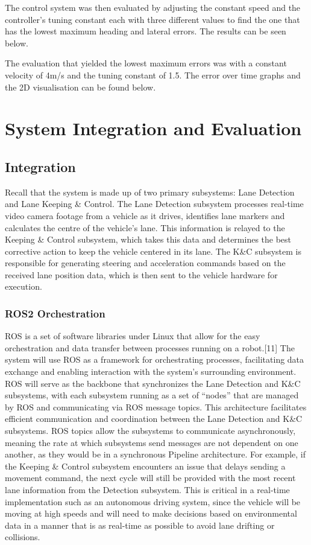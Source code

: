 \documentclass[titlepage]{article}
\begin{document}
The control system was then evaluated by adjusting the constant speed and the controller's tuning constant each with three different values to find the one that has the lowest maximum heading and lateral errors. The results can be seen below.


The evaluation that yielded the lowest maximum errors was with a constant velocity of 4m/s and the tuning constant of 1.5. The error over time graphs and the 2D visualisation can be found below.


\section{System Integration and Evaluation}

\subsection{Integration}
Recall that the system is made up of two primary subsystems: Lane Detection and Lane Keeping \& Control. The Lane Detection subsystem processes real-time video camera footage from a vehicle as it drives, identifies lane markers and calculates the centre of the vehicle’s lane. This information is relayed to the Keeping \& Control subsystem, which takes this data and determines the best corrective action to keep the vehicle centered in its lane. The K\&C subsystem is responsible for generating steering and acceleration commands based on the received lane position data, which is then sent to the vehicle hardware for execution. 


\subsubsection{ROS2 Orchestration}
ROS is a set of software libraries under Linux that allow for the easy orchestration and data transfer between processes running on a robot.[11] The system will use ROS as a framework for orchestrating processes, facilitating data exchange and enabling interaction with the system’s surrounding environment. ROS will serve as the backbone that synchronizes the Lane Detection and K\&C subsystems, with each subsystem running as a set of “nodes” that are managed by ROS and communicating via ROS message topics. This architecture facilitates efficient communication and coordination between the Lane Detection and K\&C subsystems. ROS topics allow the subsystems to communicate asynchronously, meaning the rate at which subsystems send messages are not dependent on one another, as they would be in a synchronous Pipeline architecture. For example, if the Keeping \& Control subsystem encounters an issue that delays sending a movement command, the next cycle will still be provided with the most recent lane information from the Detection subsystem. This is critical in a real-time implementation such as an autonomous driving system, since the vehicle will be moving at high speeds and will need to make decisions based on environmental data in a manner that is as real-time as possible to avoid lane drifting or collisions.
\end{document}
